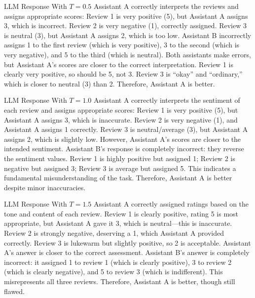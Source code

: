 \documentclass[11pt]{article}
\begin{document}
\begin{responsebox}{LLM Response With $T=0.5$}
Assistant A correctly interprets the reviews and assigns appropriate scores: Review 1 is very
positive (5), but Assistant A assigns 3, which is incorrect. Review 2 is very negative (1),
correctly assigned. Review 3 is neutral (3), but Assistant A assigns 2, which is too low. Assistant
B incorrectly assigns 1 to the first review (which is very positive), 3 to the second (which is very
negative), and 5 to the third (which is neutral). Both assistants make errors, but Assistant A's
scores are closer to the correct interpretation. Review 1 is clearly very positive, so should be 5,
not 3. Review 3 is “okay” and “ordinary,” which is closer to neutral (3) than 2. Therefore,
Assistant A is better.
\end{responsebox}

\begin{responsebox}{LLM Response With $T=1.0$}
Assistant A correctly interprets the sentiment of each review and assigns appropriate scores: Review
1 is very positive (5), but Assistant A assigns 3, which is inaccurate. Review 2 is very negative
(1), and Assistant A assigns 1 correctly. Review 3 is neutral/average (3), but Assistant A assigns
2, which is slightly low. However, Assistant A's scores are closer to the intended sentiment.
Assistant B's response is completely incorrect: they reverse the sentiment values. Review 1 is
highly positive but assigned 1; Review 2 is negative but assigned 3; Review 3 is average but
assigned 5. This indicates a fundamental misunderstanding of the task. Therefore, Assistant A is
better despite minor inaccuracies.
\end{responsebox}

\begin{responsebox}{LLM Response With $T=1.5$}
Assistant A correctly assigned ratings based on the tone and content of each review. Review 1 is
clearly positive, rating 5 is most appropriate, but Assistant A gave it 3, which is neutral—this
is inaccurate. Review 2 is strongly negative, deserving a 1, which Assistant A provided correctly.
Review 3 is lukewarm but slightly positive, so 2 is acceptable. Assistant A's answer is closer to
the correct assessment. Assistant B's answer is completely incorrect: it assigned 1 to review 1
(which is clearly positive), 3 to review 2 (which is clearly negative), and 5 to review 3 (which is
indifferent). This misrepresents all three reviews. Therefore, Assistant A is better, though still
flawed.
\end{responsebox}
\end{document}
